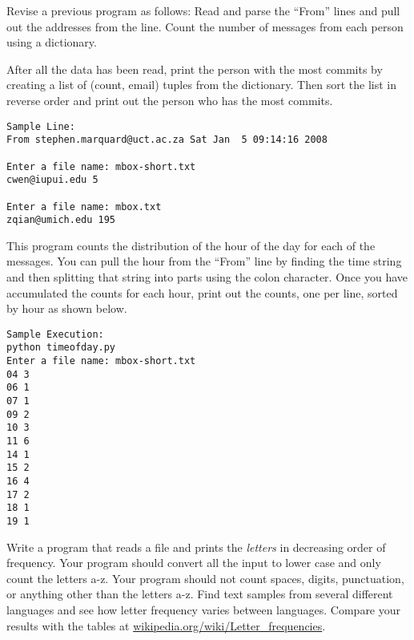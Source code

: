 \begin{ex}
Revise a previous program as follows:  Read and 
parse the ``From'' lines and pull out the 
addresses from the line.   Count the number of
messages from each person using a dictionary.

After all the data has been read, print 
the person with the most commits by creating
a list of (count, email) tuples from the 
dictionary.   Then sort the list in reverse
order and print out the person who has the most
commits.

\beforeverb
\begin{verbatim}
Sample Line:
From stephen.marquard@uct.ac.za Sat Jan  5 09:14:16 2008

Enter a file name: mbox-short.txt
cwen@iupui.edu 5

Enter a file name: mbox.txt
zqian@umich.edu 195
\end{verbatim}
\afterverb
\end{ex}
\begin{ex}
This program counts the distribution of the hour of the day for 
each of the messages. You can pull the hour from the ``From'' 
line by finding the time string and then splitting that string 
into parts using the colon character. Once you have accumulated 
the counts for each hour, print out the counts, one per line, 
sorted by hour as shown below. 
\beforeverb
\begin{verbatim}
Sample Execution:
python timeofday.py
Enter a file name: mbox-short.txt
04 3
06 1
07 1
09 2
10 3
11 6
14 1
15 2
16 4
17 2
18 1
19 1
\end{verbatim}
\afterverb
\end{ex}


\begin{ex}
Write a program that reads a file and 
prints the {\em letters} in decreasing order of frequency.  Your program
should convert all the input to lower case and only count the letters a-z.
Your program should not count spaces, digits, punctuation, or anything 
other than the letters a-z.
Find text samples from several different languages and see how letter frequency
varies between languages.  Compare your results with the tables at
\url{wikipedia.org/wiki/Letter_frequencies}.


\end{ex}

